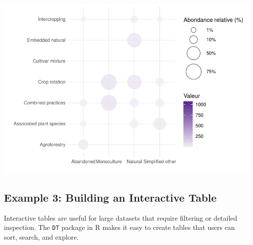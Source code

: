 \documentclass[
]{book}
\begin{document}
\includegraphics{_main_files/figure-latex/unnamed-chunk-12-1.pdf}

\subsection{Example 3: Building an Interactive Table}\label{example-3-building-an-interactive-table}

Interactive tables are useful for large datasets that require filtering or detailed inspection.
The \texttt{DT} package in R makes it easy to create tables that users can sort, search, and explore.
\end{document}
